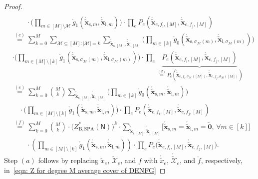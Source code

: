 \documentclass[journal]{IEEEtran}
\newcommand{\vect}[1]{ \bm{#1} }
\newcommand{\set}[1]{\mathcal{#1}}
\newcommand{\graphN}{ \mathsf{N} }
\newcommand{\ZBSPA}{ Z_{\mathrm{B,SPA}} }
\newcommand{\tset}[1]{\tilde{\mathcal{#1}}}
\newcommand{\LCTtset}[1]{\mathring{\tilde{\mathcal{#1}}}}
\newcommand{\LCTtv}[1]{ \mathring{ \tilde{ \vect{#1} } } }
\newcommand{\LCT}[1]{ \mathring{#1} }
\newcommand{\LCTt}[1]{ \mathring{ \tilde{#1} } }
\newcommand{\efi}{ e,f_i }
\newcommand{\efj}{ e,f_j }
\newcommand{\tx}{ \tilde{x} }
\newcommand{\LCTvxlm}{ \LCTtv{x}_{\mathrm{l},m} }
\newcommand{\LCTvxsm}{ \LCTtv{x}_{\mathrm{s},m} }
\newcommand{\LCTvxlM}{ \LCTtv{x}_{\mathrm{l},[M]} }
\newcommand{\LCTvxsM}{ \LCTtv{x}_{\mathrm{s},[M]} }
\newcommand{\gzero}{\LCT{g}_{0}}
\newcommand{\gone}{\LCT{g}_{1}}
\newcommand{\tv}[1]{ \tilde{\vect{#1}} }
\begin{document}
\begin{appendices}
\begin{proof}
\begin{align}
      \nonumber                                                  \\
       & \qquad
      \cdot \Biggl( \prod_{ m \in [M] \setminus \set{M} } \gone( \LCTvxsm, \LCTvxlm ) \Biggr)
      \cdot \prod_{e}
      P_{e}(\LCTtv{x}_{\efi,[M]}, \LCTtv{x}_{\efj,[M]})
      \nonumber                                                  \\
       & \overset{(c)}{=}
      \sum_{ k = 0 }^{M}
      \sum_{ \set{M} \subseteq [M]: |\set{M}| = k}
      \sum_{ \LCTvxsM, \LCTvxlM } \!\!\!
      \Biggl( \prod_{ m \in [k] } \gzero( \LCTtv{x}_{\mathrm{s}, \sigma_{\set{M}}(m)},
      \LCTtv{x}_{\mathrm{l}, \sigma_{\set{M}}(m)} ) \!\! \Biggr)
      \nonumber                                                  \\
       &
      \cdot \!\! \Biggl( \prod_{ m \in [M] \setminus [k] } \!\!\!\!\!\!  \gone( \LCTtv{x}_{\mathrm{s}, \sigma_{\set{M}}(m)},
      \LCTtv{x}_{\mathrm{l}, \sigma_{\set{M}}(m)} ) \!\! \Biggr)
      \! \cdot
      \prod_{e}
      \!\!\!\!\!
      \underbrace{
        P_{e}(\LCTtv{x}_{\efi,[M]}, \LCTtv{x}_{\efj,[M]})
      }_{ \!\!\!\!\!\!  \!\!\!\!\!\! \overset{(d)}{=} P_{e}(\LCTtv{x}_{\efi,\sigma_{\set{M}}([M])}, \LCTtv{x}_{\efj,\sigma_{\set{M}}([M])}) }
      \nonumber                                                  \\
       & \overset{(e)}{=}
      \sum_{ k = 0 }^{M}
      \binom{M}{k}
      \sum_{ \LCTvxsM, \LCTvxlM }
      \Biggl( \prod_{ m \in [k] } \gzero( \LCTvxsm, \LCTvxlm ) \Biggr)
      \nonumber                                                  \\
       & \quad
      \cdot \Biggl( \prod_{ m \in [M] \setminus [k] } \gone( \LCTvxsm, \LCTvxlm ) \Biggr)
      \cdot \prod_{e}
      P_{e}(\LCTtv{x}_{\efi,[M]}, \LCTtv{x}_{\efj,[M]})\nonumber \\
       & \overset{(f)}{=}
      \sum_{ k = 0 }^{M}
      \binom{M}{k}
      \cdot
      \bigl( \ZBSPA^{*}( \graphN) \bigr)^{\! k}
      \! \cdot \!\!\!\!\! \!\!\!\!\! \sum_{ \LCTvxsM, \LCTvxlM } \!\!\!\!\!
      \bigl[ \LCTvxsm \! = \! \LCTvxlm \! = \! \tv{0},\, \forall m \in [k] \bigr]
      \nonumber
      \\&\qquad\cdot
      \left(
      \prod_{ m \in [M] \setminus [k] }
      \gone( \LCTvxsm, \LCTvxlm )
      \right) \!\! \cdot  \prod_{e}
      P_{e}\bigl( \LCTtv{x}_{\efi,[M]}, \LCTtv{x}_{\efj,[M]} \bigr).\nonumber
    \end{align}
    Step $(a)$ follows by
    replacing $ \tx_{e} $, $ \tset{X}_e $, and
    $ f $ with $ \LCTt{x}_{e} $, $ \LCTtset{X}_{e} $, and $ \LCT{f} $, respectively, in~\eqref{eqn: Z for degree M average cover of DENFG}

\end{proof}
\end{appendices}
\end{document}
